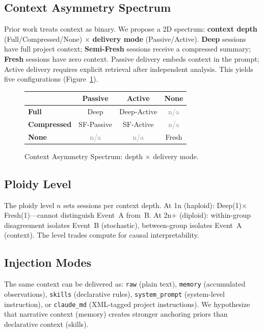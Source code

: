 \documentclass{article}
\begin{document}
\subsection{Context Asymmetry Spectrum}

Prior work treats context as binary. We propose a 2D spectrum: \textbf{context depth} (Full/Compressed/None) $\times$ \textbf{delivery mode} (Passive/Active). \textbf{Deep} sessions have full project context; \textbf{Semi-Fresh} sessions receive a compressed summary; \textbf{Fresh} sessions have zero context. Passive delivery embeds context in the prompt; Active delivery requires explicit retrieval after independent analysis. This yields five configurations (Figure~\ref{fig:2d-matrix}).

\begin{figure}[t]
\centering
\caption{Context Asymmetry Spectrum: depth $\times$ delivery mode.}
\label{fig:2d-matrix}
\vspace{0.3em}
\footnotesize
\begin{tabular}{@{} >{\bfseries}l c c c @{}}
\toprule
& \textbf{Passive} & \textbf{Active} & \textbf{None} \\
\midrule
Full & Deep & Deep-Active & \textcolor{gray}{n/a} \\
Compressed & SF-Passive & SF-Active & \textcolor{gray}{n/a} \\
None & \textcolor{gray}{n/a} & \textcolor{gray}{n/a} & Fresh \\
\bottomrule
\end{tabular}
\end{figure}

\subsection{Ploidy Level}

The ploidy level $n$ sets sessions per context depth. At 1n (haploid): Deep(1)$\times$Fresh(1)---cannot distinguish Event~A from~B. At 2n+ (diploid): within-group disagreement isolates Event~B (stochastic), between-group isolates Event~A (context). The level trades compute for causal interpretability.

\subsection{Injection Modes}

The same context can be delivered as: \texttt{raw} (plain text), \texttt{memory} (accumulated observations), \texttt{skills} (declarative rules), \texttt{system\_prompt} (system-level instruction), or \texttt{claude\_md} (XML-tagged project instructions). We hypothesize that narrative context (memory) creates stronger anchoring priors than declarative context (skills).
\end{document}
